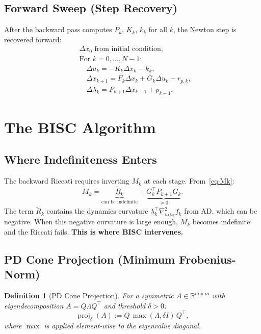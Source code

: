 \documentclass[11pt]{article}
\newtheorem{definition}[theorem]{Definition}
\DeclareMathOperator{\proj}{proj}
\begin{document}
\subsection{Forward Sweep (Step Recovery)}

After the backward pass computes $P_k$, $K_k$, $k_k$ for all $k$, the Newton
step is recovered forward:
\begin{equation}
\begin{aligned}
  &\Delta x_0 \text{ from initial condition}, \\
  &\text{For } k = 0, \dots, N\!-\!1\text{:} \\
  &\quad \Delta u_k = -K_k \Delta x_k - k_k, \\
  &\quad \Delta x_{k+1} = F_k \Delta x_k + G_k \Delta u_k - r_{p,k}, \\
  &\quad \Delta \lambda_k = P_{k+1} \Delta x_{k+1} + p_{k+1}.
\end{aligned}
\end{equation}


\section{The BISC Algorithm}

\subsection{Where Indefiniteness Enters}

The backward Riccati requires inverting $M_k$ at each stage. From~\eqref{eq:Mk}:
\begin{equation}
  M_k = \underbrace{\tilde{R}_k}_{\text{can be indefinite}} + \underbrace{G_k^\top P_{k+1} G_k}_{\succeq 0}.
\end{equation}
The term $\tilde{R}_k$ contains the dynamics curvature $\lambda_k^\top \nabla^2_{u_k u_k} f_k$
from AD, which can be negative. When this negative curvature is large enough,
$M_k$ becomes indefinite and the Riccati fails. \textbf{This is where BISC intervenes.}


\subsection{PD Cone Projection (Minimum Frobenius-Norm)}

\begin{definition}[PD Cone Projection]
For a symmetric $A \in \mathbb{R}^{m \times m}$ with eigendecomposition
$A = Q \Lambda Q^\top$ and threshold $\delta > 0$:
\begin{equation}\label{eq:proj}
  \proj_\delta(A) := Q\,\max(\Lambda, \delta I)\,Q^\top,
\end{equation}
where $\max$ is applied element-wise to the eigenvalue diagonal.
\end{definition}
\end{document}
